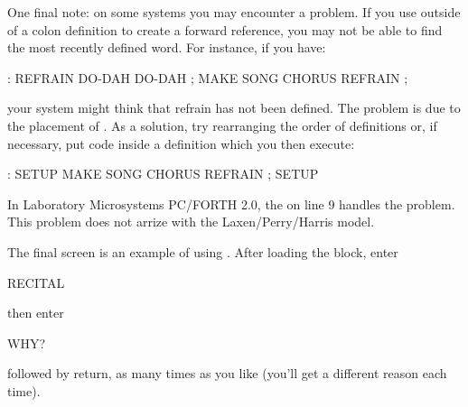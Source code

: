 One final note:  on some systems you may encounter a problem.  If
you use  outside of a colon definition to create a forward reference,
you may not be able to find the most recently defined word.  For instance,
if you have:
\begin{Code}
: REFRAIN   DO-DAH  DO-DAH ;
MAKE SONG  CHORUS  REFRAIN ;
\end{Code}
your system might think that refrain has not been defined.  The problem
is due to the placement of .  As a solution, try rearranging
the order of definitions or, if necessary, put  code inside a 
definition which you then execute:
\begin{Code}
: SETUP   MAKE SONG  CHORUS  REFRAIN ;   SETUP
\end{Code}
In Laboratory Microsystems PC/FORTH 2.0, the  on line 9 
handles the problem.  This problem does not arrize with the Laxen/Perry/Harris
model.

The final screen is an example of using .  After loading 
the block, enter
\begin{Code}
RECITAL
\end{Code}
then enter 
\begin{Code}
WHY?
\end{Code}
followed by return, as many times as you like (you'll get a different
reason each time).

